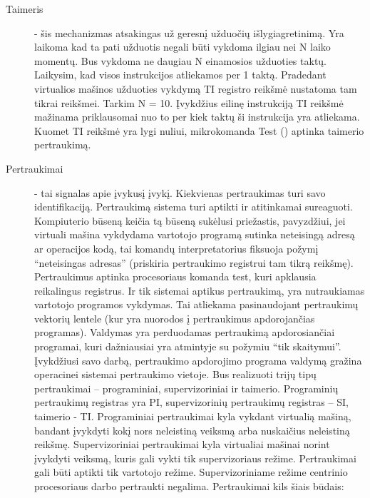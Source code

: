 \begin{description}
\item[Taimeris] - šis mechanizmas atsakingas už geresnį užduočių išlygiagretinimą. Yra laikoma kad ta pati užduotis negali būti vykdoma ilgiau nei N laiko momentų. Bus vykdoma ne daugiau N einamosios užduoties taktų. Laikysim, kad visos instrukcijos atliekamos per 1 taktą. Pradedant virtualios mašinos užduoties vykdymą TI registro reikšmė nustatoma tam tikrai reikšmei. Tarkim N = 10. Įvykdžius eilinę instrukciją TI reikšmė mažinama priklausomai nuo to per kiek taktų ši instrukcija yra atliekama. Kuomet TI reikšmė yra lygi nuliui, mikrokomanda Test () aptinka taimerio pertraukimą.
\end{description}

\begin{description}
\item[Pertraukimai] - tai signalas apie įvykusį įvykį. Kiekvienas pertraukimas turi savo identifikaciją. Pertraukimą sistema turi aptikti ir atitinkamai sureaguoti. Kompiuterio būseną keičia tą būseną sukėlusi priežastis, pavyzdžiui, jei virtuali mašina vykdydama vartotojo programą sutinka neteisingą adresą ar operacijos kodą, tai komandų interpretatorius fiksuoja požymį “neteisingas adresas” (priskiria pertraukimo registrui tam tikrą reikšmę). Pertraukimus aptinka procesoriaus komanda test, kuri apklausia reikalingus registrus. Ir tik sistemai aptikus pertraukimą, yra nutraukiamas vartotojo programos vykdymas. Tai atliekama pasinaudojant pertraukimų vektorių lentele (kur yra nuorodos į pertraukimus apdorojančias programas). Valdymas yra perduodamas pertraukimą apdorosiančiai programai, kuri dažniausiai yra atmintyje su požymiu “tik skaitymui”. Įvykdžiusi savo darbą, pertraukimo apdorojimo programa valdymą gražina operacinei sistemai pertraukimo vietoje. Bus realizuoti trijų tipų pertraukimai – programiniai, supervizoriniai ir taimerio. Programinių pertraukimų registras yra PI, supervizorinių pertraukimų registras – SI, taimerio - TI. Programiniai pertraukimai kyla vykdant virtualią mašiną, bandant įvykdyti kokį nors neleistiną veiksmą arba nuskaičius neleistiną reikšmę. Supervizoriniai pertraukimai kyla virtualiai mašinai norint įvykdyti veiksmą, kuris gali vykti tik supervizoriaus režime. Pertraukimai gali būti aptikti tik vartotojo režime. Supervizoriniame režime centrinio procesoriaus darbo pertraukti negalima. Pertraukimai kils šiais būdais:
\end{description}
